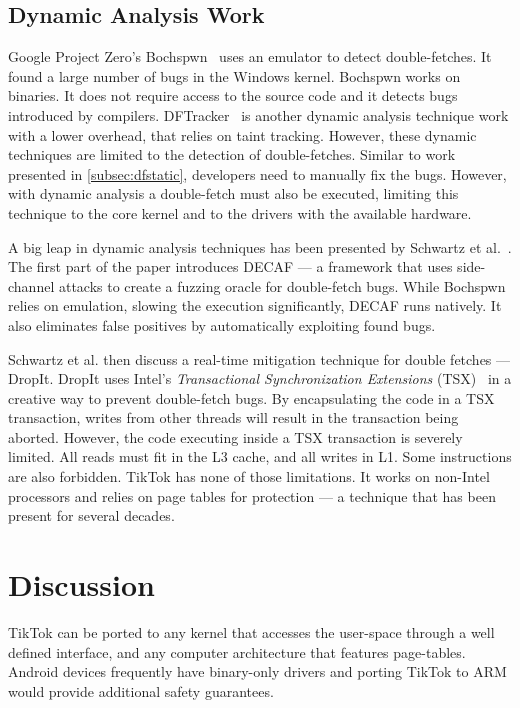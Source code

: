 \documentclass[conference]{IEEEtran}
\newcommand{\sysname}{TikTok}
\begin{document}
\subsection{Dynamic Analysis Work}
\label{subsec:dfdynamic}
Google Project Zero's Bochspwn~\cite{jurczyk2013bochspwn} uses an emulator to
detect double-fetches. It found a large number of bugs in the Windows kernel.
Bochspwn works on binaries. It does not require access to the source code and it
detects bugs introduced by compilers. DFTracker~\cite{wang2019dftracker} is
another dynamic analysis technique work with a lower overhead, that relies on
taint tracking. However, these dynamic techniques are limited to the detection
of double-fetches. Similar to work presented in \autoref{subsec:dfstatic},
developers need to manually fix the bugs. However, with dynamic analysis a
double-fetch must also be executed, limiting this technique to the core kernel
and to the drivers with the available hardware.

A big leap in dynamic analysis techniques has been presented by Schwartz et
al.~\cite{schwarz2018automated}. The first part of the paper introduces DECAF
--- a framework that uses side-channel attacks to create a fuzzing oracle for
double-fetch bugs. While Bochspwn relies on emulation, slowing the execution
significantly, DECAF runs natively. It also eliminates false positives by
automatically exploiting found bugs.

Schwartz et al. then discuss a real-time mitigation technique for double fetches
--- DropIt. DropIt uses Intel's \emph{Transactional Synchronization Extensions}
(TSX)~\cite{intel64and} in a creative way to prevent double-fetch bugs. By
encapsulating the code in a TSX transaction, writes from other threads will
result in the transaction being aborted. However, the code executing inside a
TSX transaction is severely limited. All reads must fit in the L3 cache, and all
writes in L1. Some instructions are also forbidden. \sysname{} has none of those
limitations. It works on non-Intel processors and relies on page tables for
protection --- a technique that has been present for several decades.

\section{Discussion}
\label{sec:discussion}
\sysname{} can be ported to any kernel that accesses the user-space through a
well defined interface, and any computer architecture that features page-tables.
Android devices frequently have binary-only drivers and porting \sysname{} to 
ARM would provide additional safety guarantees.
\end{document}

